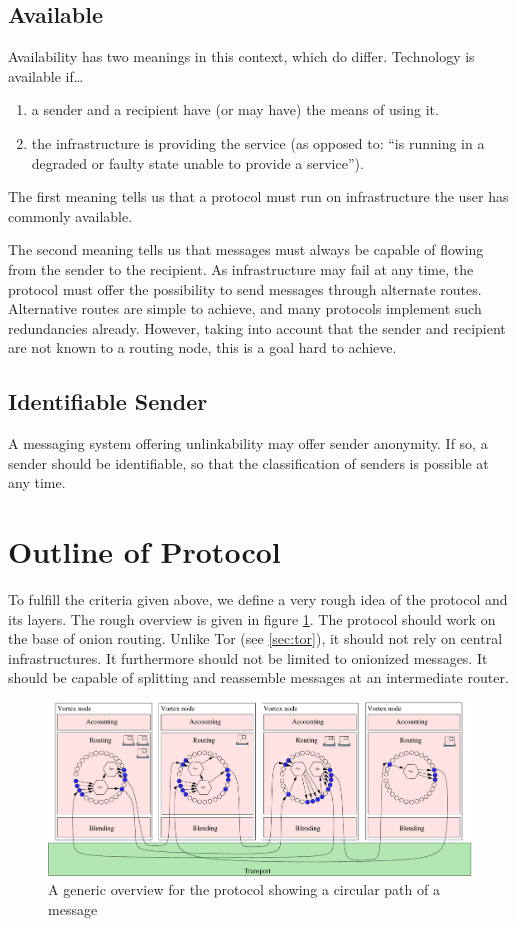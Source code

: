 \subsection{Available}
Availability has two meanings in this context, which do differ. Technology is available if\ldots
\begin{enumerate}
	\item a sender and a recipient have (or may have) the means of using it.
	\item the infrastructure is providing the service (as opposed to: ``is running in a degraded or faulty state unable to provide a service'').
\end{enumerate}

The first meaning tells us that a protocol must run on infrastructure the user has commonly available.

The second meaning tells us that messages must always be capable of flowing from the sender to the recipient. As infrastructure may fail at any time, the protocol must offer the possibility to send messages through alternate routes. Alternative routes are simple to achieve, and many protocols implement such redundancies already. However, taking into account that the sender and recipient are not known to a routing node, this is a goal hard to achieve.

\subsection{Identifiable Sender}
A messaging system offering unlinkability may offer sender anonymity. If so, a sender should be identifiable, so that the classification of senders is possible at any time.

\section{Outline of Protocol}
To fulfill the criteria given above, we define a very rough idea of the protocol and its layers. The rough overview is given in figure \ref{fig:roughProtocolDesign}. The protocol should work on the base of onion routing. Unlike Tor (see \ref{sec:tor}), it should not rely on central infrastructures. It furthermore should not be limited to onionized messages. It should be capable of splitting and reassemble messages at an intermediate router.

\begin{figure}[ht]
	\includegraphics[width=\columnwidth]{inc/roughProtocolDesign.pdf}
	\caption{A generic overview for the protocol showing a circular path of a message}
	\label{fig:roughProtocolDesign}
\end{figure}    

